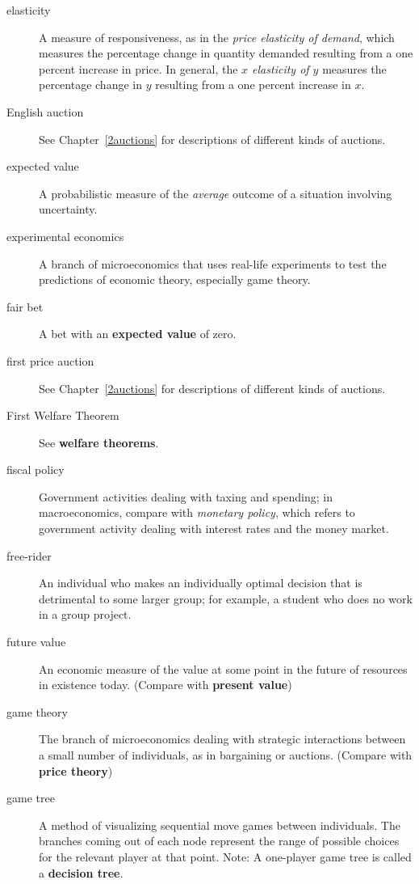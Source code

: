 \begin{description}
\item[elasticity] A measure of responsiveness, as in the \emph{price elasticity of demand}, which measures the percentage change in quantity demanded resulting from a one percent increase in price. In general, the \emph{$x$ elasticity of $y$} measures the percentage change in $y$ resulting from a one percent increase in $x$.

\item[English auction] See Chapter~\ref{2auctions} for descriptions of different kinds of auctions.

\item[expected value] A probabilistic measure of the \emph{average} outcome of a situation involving uncertainty.

\item[experimental economics] A branch of microeconomics that uses real-life experiments to test the predictions of economic theory, especially game theory.

\item[fair bet] A bet with an \textbf{expected value} of zero.  

\item[first price auction] See Chapter~\ref{2auctions} for descriptions of different kinds of auctions.

\item[First Welfare Theorem] See \textbf{welfare theorems}. 

\item[fiscal policy] Government activities dealing with taxing and spending; in macroeconomics, compare with \emph{monetary policy}, which refers to government activity dealing with interest rates and the money market.

\item[free-rider] An individual who makes an individually optimal decision that is detrimental to some larger group; for example, a student who does no work in a group project.

\item[future value] An economic measure of the value at some point in the future of resources in existence today. (Compare with \textbf{present value})

\item[game theory] The branch of microeconomics dealing with strategic interactions between a small number of individuals, as in bargaining or auctions. (Compare with \textbf{price theory})

\item[game tree] A method of visualizing sequential move games between individuals. The branches coming out of each node represent the range of possible choices for the relevant player at that point. Note: A one-player game tree is called a \textbf{decision tree}.


\end{description}
